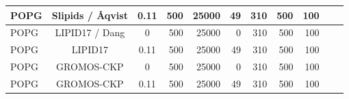 \documentclass[journal=jpcbfk]{achemso}
\begin{document}
\begin{table}[htb]
\begin{minipage}[t]{\textwidth}
{\begin{tabular}{l c c r r r r r r c c}
      POPG         & Slipids / {\AA}qvist \cite{jambeck13,aqvist90}    & 0.11    & 500 & 25000 & 49  &  310  & 500 & 100 & \cite{POPGslipids150mMNaCl} \\
      \hline
      POPG             & LIPID17 / Dang \cite{gould18,smith94}         & 0              & 500 & 25000 & 0   &  310  & 500 & 100 & \cite{POPGlipid17} \\
      POPG             & LIPID17 \cite{??}         & 0.11           & 500 & 25000 & 49  &  310  & 500 & 100 & \cite{POPGlipid17150mMNaCl} \\
      \hline
      POPG             & GROMOS-CKP \cite{??}         & 0              & 500 & 25000 & 0  &  310  & 500 & 100 & \cite{POPGgromosCKP} \\
      POPG             & GROMOS-CKP \cite{??}         & 0.11           & 500 & 25000 & 49 &  310  & 500 & 100 & \cite{POPGgromosCKP150mMNaCl} \\
    \end{tabular}
    }
  \end{minipage}
     \\
\end{table}
\end{document}
